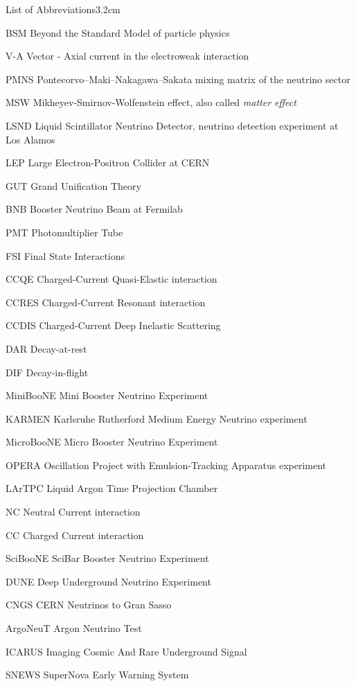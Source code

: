 \begin{mclistof}{List of Abbreviations}{3.2cm}

\item[BSM] Beyond the Standard Model of particle physics
\item[V-A] Vector - Axial current in the electroweak interaction
\item[PMNS] Pontecorvo–Maki–Nakagawa–Sakata mixing matrix of the neutrino sector
\item[MSW] Mikheyev-Smirnov-Wolfenstein effect, also called \emph{matter effect}
\item[LSND] Liquid Scintillator Neutrino Detector, neutrino detection experiment at Los Alamos
\item[LEP] Large Electron-Positron Collider at CERN
\item[GUT] Grand Unification Theory
\item[BNB] Booster Neutrino Beam at Fermilab
\item[PMT] Photomultiplier Tube
\item[FSI] Final State Interactions 
\item[CCQE] Charged-Current Quasi-Elastic interaction
\item[CCRES] Charged-Current Resonant interaction
\item[CCDIS] Charged-Current Deep Inelastic Scattering
\item[DAR] Decay-at-rest
\item[DIF] Decay-in-flight
\item[MiniBooNE] Mini Booster Neutrino Experiment
\item[KARMEN] Karlsruhe Rutherford Medium Energy Neutrino experiment
\item[MicroBooNE] Micro Booster Neutrino Experiment
\item[OPERA] Oscillation Project with Emulsion-Tracking Apparatus experiment
\item[LArTPC] Liquid Argon Time Projection Chamber
\item[NC] Neutral Current interaction
\item[CC] Charged Current interaction
\item[SciBooNE] SciBar Booster Neutrino Experiment
\item[DUNE] Deep Underground Neutrino Experiment
\item[CNGS] CERN Neutrinos to Gran Sasso
\item[ArgoNeuT] Argon Neutrino Test
\item[ICARUS] Imaging Cosmic And Rare Underground Signal
\item[SNEWS] SuperNova Early Warning System
\end{mclistof} 
